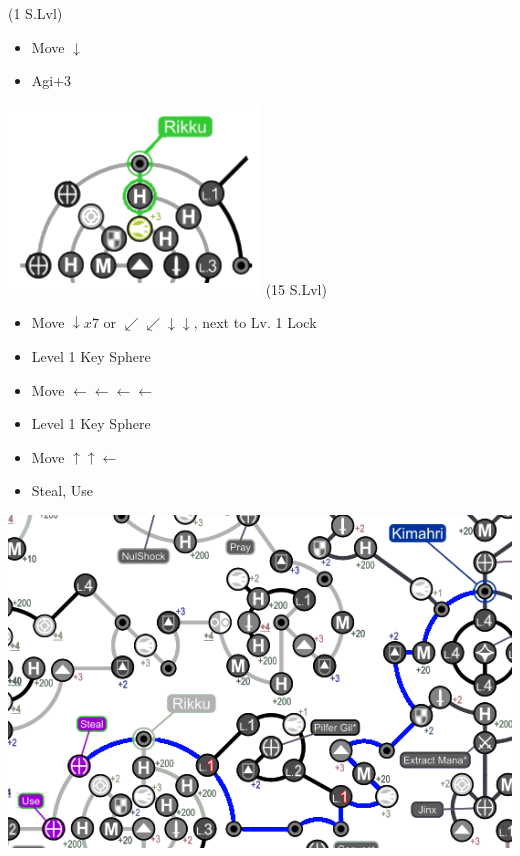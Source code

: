 \begin{spheregrid}
    \begin{multicols}{2}
        \begin{itemize}
            \rikkuf (1 S.Lvl)
            \begin{itemize}
                \item Move $\downarrow$
                \item Agi+3
            \end{itemize}
            \includegraphics[width=.5\columnwidth]{graphics/macalaniarikku}
            \kimahrif (15 S.Lvl)
            \begin{itemize}
                \item Move $\downarrow x7$ or $\swarrow\swarrow\downarrow\downarrow$, next to Lv. 1 Lock
                \item Level 1 Key Sphere
                \item Move $\leftarrow\leftarrow\leftarrow\leftarrow$
                \item Level 1 Key Sphere
                \item Move $\uparrow\uparrow\leftarrow$
                \item Steal, Use
            \end{itemize}
            \includegraphics[width=.8\columnwidth]{graphics/Kimahri_post_spheremorph}
        \end{itemize}
    \end{multicols}
\end{spheregrid}
